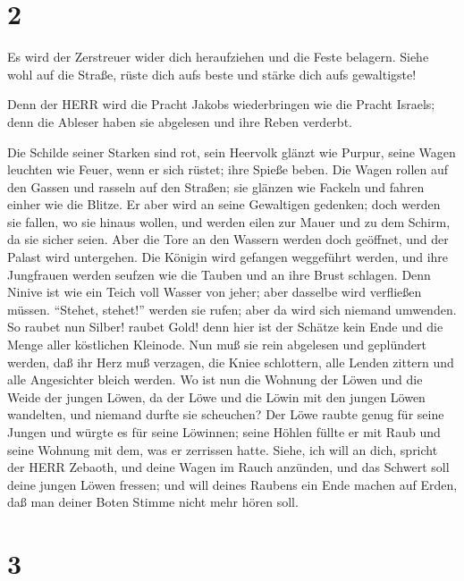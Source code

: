 \hypertarget{section-1}{%
\section{2}\label{section-1}}

 Es wird der Zerstreuer wider dich heraufziehen und die
Feste belagern. Siehe wohl auf die Straße, rüste dich aufs beste und
stärke dich aufs gewaltigste!

 Denn der HERR wird die Pracht Jakobs wiederbringen wie die
Pracht Israels; denn die Ableser haben sie abgelesen und ihre Reben
verderbt.

 Die Schilde seiner Starken sind rot, sein Heervolk glänzt
wie Purpur, seine Wagen leuchten wie Feuer, wenn er sich rüstet; ihre
Spieße beben.  Die Wagen rollen auf den Gassen und rasseln
auf den Straßen; sie glänzen wie Fackeln und fahren einher wie die
Blitze.  Er aber wird an seine Gewaltigen gedenken; doch
werden sie fallen, wo sie hinaus wollen, und werden eilen zur Mauer und
zu dem Schirm, da sie sicher seien.  Aber die Tore an den
Wassern werden doch geöffnet, und der Palast wird untergehen.
 Die Königin wird gefangen weggeführt werden, und ihre
Jungfrauen werden seufzen wie die Tauben und an ihre Brust schlagen.
 Denn Ninive ist wie ein Teich voll Wasser von jeher; aber
dasselbe wird verfließen müssen. ``Stehet, stehet!'' werden sie rufen;
aber da wird sich niemand umwenden.  So raubet nun Silber!
raubet Gold! denn hier ist der Schätze kein Ende und die Menge aller
köstlichen Kleinode.  Nun muß sie rein abgelesen und
geplündert werden, daß ihr Herz muß verzagen, die Kniee schlottern, alle
Lenden zittern und alle Angesichter bleich werden.  Wo ist
nun die Wohnung der Löwen und die Weide der jungen Löwen, da der Löwe
und die Löwin mit den jungen Löwen wandelten, und niemand durfte sie
scheuchen?  Der Löwe raubte genug für seine Jungen und
würgte es für seine Löwinnen; seine Höhlen füllte er mit Raub und seine
Wohnung mit dem, was er zerrissen hatte.  Siehe, ich will
an dich, spricht der HERR Zebaoth, und deine Wagen im Rauch anzünden,
und das Schwert soll deine jungen Löwen fressen; und will deines Raubens
ein Ende machen auf Erden, daß man deiner Boten Stimme nicht mehr hören
soll.

\hypertarget{section-2}{%
\section{3}\label{section-2}}


